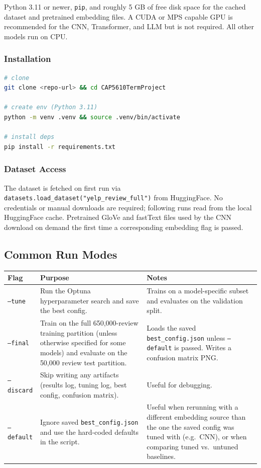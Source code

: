 \documentclass[12pt]{article}
\begin{document}
Python 3.11 or newer, \texttt{pip}, and roughly 5 GB of free disk space for the cached dataset and pretrained embedding files. A CUDA or MPS capable GPU is recommended for the CNN, Transformer, and LLM but is not required. All other models run on CPU.

\subsubsection{Installation}

\begin{lstlisting}[language=bash]
# clone
git clone <repo-url> && cd CAP5610TermProject

# create env (Python 3.11)
python -m venv .venv && source .venv/bin/activate

# install deps
pip install -r requirements.txt
\end{lstlisting}

\subsubsection{Dataset Access}

The dataset is fetched on first run via \texttt{datasets.load\_dataset("yelp\_review\_full")} from HuggingFace. No credentials or manual downloads are required; following runs read from the local HuggingFace cache. Pretrained GloVe and fastText files used by the CNN download on demand the first time a corresponding embedding flag is passed.

\newpage

\subsection{Common Run Modes}

\begin{longtable}{p{} p{} p{}}
    \toprule
    Flag               & Purpose & Notes \\
    \midrule
    \texttt{--tune}    & Run the Optuna hyperparameter search and save the best config. & Trains on a model-specific subset and evaluates on the validation split. \\
    \texttt{--final}   & Train on the full 650,000-review training partition (unless otherwise specified for some models) and evaluate on the 50,000 review test partition. & Loads the saved \texttt{best\_config.json} unless \texttt{--default} is passed. Writes a confusion matrix PNG. \\
    \texttt{--discard} & Skip writing any artifacts (results log, tuning log, best config, confusion matrix). & Useful for debugging. \\
    \texttt{--default} & Ignore saved \texttt{best\_config.json} and use the hard-coded defaults in the script. & Useful when rerunning with a different embedding source than the one the saved config was tuned with (e.g.\ CNN), or when comparing tuned vs.\ untuned baselines. \\
    \bottomrule
\end{longtable}
\end{document}
